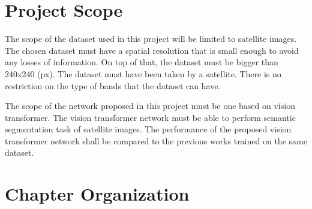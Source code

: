\section{Project Scope}

The scope of the dataset used in this project will be limited to satellite images. The chosen dataset must have a spatial resolution that is small enough to avoid any losses of information. On top of that, the dataset must be bigger than 240x240 (px). The dataset must have been taken by a satellite. There is no restriction on the type of bands that the dataset can have.

The scope of the network proposed in this project must be one based on vision transformer.  The vision transformer network must be able to perform semantic segmentation task of satellite images. The performance of the proposed vision transformer network shall be compared to the  previous works trained on the same dataset.

\section{Chapter Organization}
